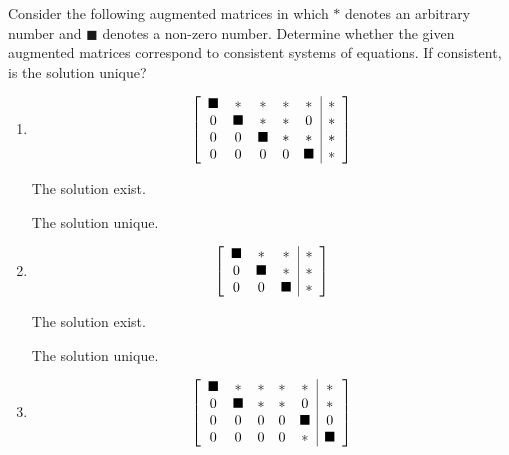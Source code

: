 \documentclass{ximera}
\author{Zack Reed}
\begin{document}
\begin{exercise}

Consider the following augmented matrices in which $\ast$ denotes an
arbitrary number and $\blacksquare$ denotes a non-zero number. Determine
whether the given augmented matrices correspond to consistent systems of equations. If consistent, is the
solution unique?

\begin{enumerate}
    \item \begin{equation*}
    \startmat{ccccc|c}
      \blacksquare & \ast & \ast & \ast & \ast & \ast \\
      0 & \blacksquare & \ast & \ast & 0 & \ast \\
      0 & 0 & \blacksquare & \ast & \ast & \ast \\
      0 & 0 & 0 & 0 & \blacksquare & \ast
    \stopmat
\end{equation*}

The solution  exist.

    \begin{problem}
    
        The solution  unique.

    \end{problem}

\item \begin{equation*}
    \startmat{ccc|c}
      \blacksquare & \ast & \ast & \ast \\
      0 & \blacksquare & \ast & \ast \\
      0 & 0 & \blacksquare & \ast
    \stopmat
\end{equation*}

The solution  exist.

    \begin{problem}
    
        The solution  unique.

    \end{problem}

\item \begin{equation*}
    \startmat{ccccc|c}
      \blacksquare & \ast & \ast & \ast & \ast & \ast \\
      0 & \blacksquare & \ast & \ast & 0 & \ast \\
      0 & 0 & 0 & 0 & \blacksquare & 0 \\
      0 & 0 & 0 & 0 & \ast & \blacksquare
    \stopmat
\end{equation*}


\end{enumerate}
\end{exercise}
\end{document}
